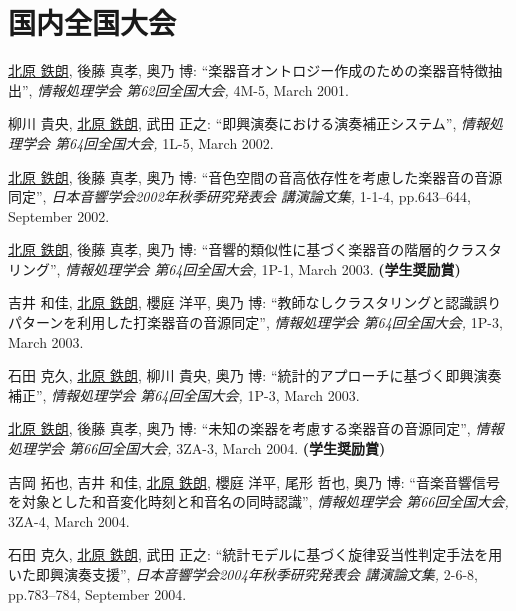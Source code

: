 \section*{国内全国大会}
\begin{Enumerate}
  
\item 
\underline{北原 鉄朗}, 
後藤 真孝, 
奥乃 博: 
    ``楽器音オントロジー作成のための楽器音特徴抽出'', 
    {\it 情報処理学会 第62回全国大会,} 4M-5, March 2001. 

\item 
柳川 貴央, 
\underline{北原 鉄朗}, 
武田 正之: 
    ``即興演奏における演奏補正システム'', 
    {\it 情報処理学会 第64回全国大会,} 1L-5, March 2002. 

\item 
\underline{北原 鉄朗}, 
後藤 真孝, 
奥乃 博: 
    ``音色空間の音高依存性を考慮した楽器音の音源同定'', 
    {\it 日本音響学会2002年秋季研究発表会 講演論文集,} 1-1-4, pp.643--644, September 2002. 

\item 
\underline{北原 鉄朗}, 
後藤 真孝, 
奥乃 博: 
    ``音響的類似性に基づく楽器音の階層的クラスタリング'', 
    {\it 情報処理学会 第64回全国大会,} 1P-1, March 2003. 
{\bf (学生奨励賞)}
\item 
吉井 和佳, 
\underline{北原 鉄朗}, 
櫻庭
      洋平, 
奥乃 博: 
    ``教師なしクラスタリングと認識誤りパターンを利用した打楽器音の音源同定'', 
    {\it 情報処理学会 第64回全国大会,} 1P-3, March 2003. 

\item 
石田 克久, 
\underline{北原 鉄朗}, 
柳川 貴央, 
奥乃 博: 
    ``統計的アプローチに基づく即興演奏補正'', 
    {\it 情報処理学会 第64回全国大会,} 1P-3, March 2003. 

\item 
\underline{北原 鉄朗}, 
後藤 真孝, 
奥乃 博: 
    ``未知の楽器を考慮する楽器音の音源同定'', 
    {\it 情報処理学会 第66回全国大会,} 3ZA-3, March 2004. 
{\bf (学生奨励賞)}
\item 
吉岡 拓也, 
吉井 和佳, 
\underline{北原 鉄朗}, 
櫻庭
      洋平, 
尾形 哲也, 
奥乃 博: 
    ``音楽音響信号を対象とした和音変化時刻と和音名の同時認識'', 
    {\it 情報処理学会 第66回全国大会,} 3ZA-4, March 2004. 

\item 
石田 克久, 
\underline{北原 鉄朗}, 
武田 正之: 
    ``統計モデルに基づく旋律妥当性判定手法を用いた即興演奏支援'', 
    {\it 日本音響学会2004年秋季研究発表会 講演論文集,} 2-6-8, pp.783--784, September 2004. 


\end{Enumerate}
